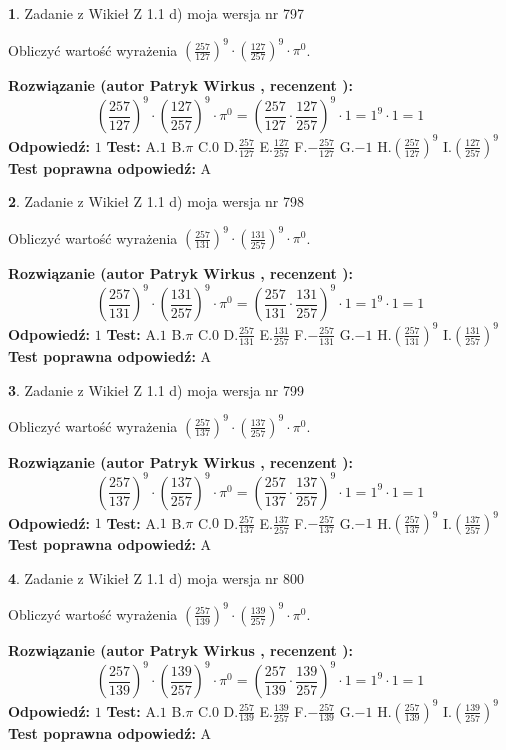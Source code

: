 \documentclass[12pt, a4paper]{article}
\theoremstyle{definition} %
\newtheorem{zad}{}
\newcommand{\zadStart}[1]{\begin{zad}#1\newline}
\newcommand{\zadStop}{\end{zad}}
\newcommand{\rozwStart}[2]{\noindent \textbf{Rozwiązanie (autor #1 , recenzent #2): }\newline}
\newcommand{\rozwStop}{\newline}
\newcommand{\odpStart}{\noindent \textbf{Odpowiedź:}\newline}
\newcommand{\odpStop}{\newline}
\newcommand{\testStart}{\noindent \textbf{Test:}\newline}
\newcommand{\testStop}{\newline}
\newcommand{\kluczStart}{\noindent \textbf{Test poprawna odpowiedź:}\newline}
\newcommand{\kluczStop}{\newline}
\begin{document}
\zadStart{Zadanie z Wikieł Z 1.1 d) moja wersja nr 797}

Obliczyć wartość wyrażenia $(\frac{257}{127})^{9} \cdot (\frac{127}{257})^{9} \cdot \pi^{0}$.
\zadStop
\rozwStart{Patryk Wirkus}{}
$$(\frac{257}{127})^{9} \cdot (\frac{127}{257})^{9} \cdot \pi^{0} = (\frac{257}{127} \cdot \frac{127}{257})^{9} \cdot 1 = 1^{9} \cdot 1 = 1$$
\rozwStop
\odpStart
$1$
\odpStop
\testStart
A.$1$ B.$\pi$ C.$0$ D.$\frac{257}{127}$ E.$\frac{127}{257}$
F.$-\frac{257}{127}$ G.$-1$
H.$(\frac{257}{127})^{9}$
I.$(\frac{127}{257})^{9}$
\testStop
\kluczStart
A
\kluczStop



\zadStart{Zadanie z Wikieł Z 1.1 d) moja wersja nr 798}

Obliczyć wartość wyrażenia $(\frac{257}{131})^{9} \cdot (\frac{131}{257})^{9} \cdot \pi^{0}$.
\zadStop
\rozwStart{Patryk Wirkus}{}
$$(\frac{257}{131})^{9} \cdot (\frac{131}{257})^{9} \cdot \pi^{0} = (\frac{257}{131} \cdot \frac{131}{257})^{9} \cdot 1 = 1^{9} \cdot 1 = 1$$
\rozwStop
\odpStart
$1$
\odpStop
\testStart
A.$1$ B.$\pi$ C.$0$ D.$\frac{257}{131}$ E.$\frac{131}{257}$
F.$-\frac{257}{131}$ G.$-1$
H.$(\frac{257}{131})^{9}$
I.$(\frac{131}{257})^{9}$
\testStop
\kluczStart
A
\kluczStop



\zadStart{Zadanie z Wikieł Z 1.1 d) moja wersja nr 799}

Obliczyć wartość wyrażenia $(\frac{257}{137})^{9} \cdot (\frac{137}{257})^{9} \cdot \pi^{0}$.
\zadStop
\rozwStart{Patryk Wirkus}{}
$$(\frac{257}{137})^{9} \cdot (\frac{137}{257})^{9} \cdot \pi^{0} = (\frac{257}{137} \cdot \frac{137}{257})^{9} \cdot 1 = 1^{9} \cdot 1 = 1$$
\rozwStop
\odpStart
$1$
\odpStop
\testStart
A.$1$ B.$\pi$ C.$0$ D.$\frac{257}{137}$ E.$\frac{137}{257}$
F.$-\frac{257}{137}$ G.$-1$
H.$(\frac{257}{137})^{9}$
I.$(\frac{137}{257})^{9}$
\testStop
\kluczStart
A
\kluczStop



\zadStart{Zadanie z Wikieł Z 1.1 d) moja wersja nr 800}

Obliczyć wartość wyrażenia $(\frac{257}{139})^{9} \cdot (\frac{139}{257})^{9} \cdot \pi^{0}$.
\zadStop
\rozwStart{Patryk Wirkus}{}
$$(\frac{257}{139})^{9} \cdot (\frac{139}{257})^{9} \cdot \pi^{0} = (\frac{257}{139} \cdot \frac{139}{257})^{9} \cdot 1 = 1^{9} \cdot 1 = 1$$
\rozwStop
\odpStart
$1$
\odpStop
\testStart
A.$1$ B.$\pi$ C.$0$ D.$\frac{257}{139}$ E.$\frac{139}{257}$
F.$-\frac{257}{139}$ G.$-1$
H.$(\frac{257}{139})^{9}$
I.$(\frac{139}{257})^{9}$
\testStop
\kluczStart
A
\kluczStop
\end{document}
